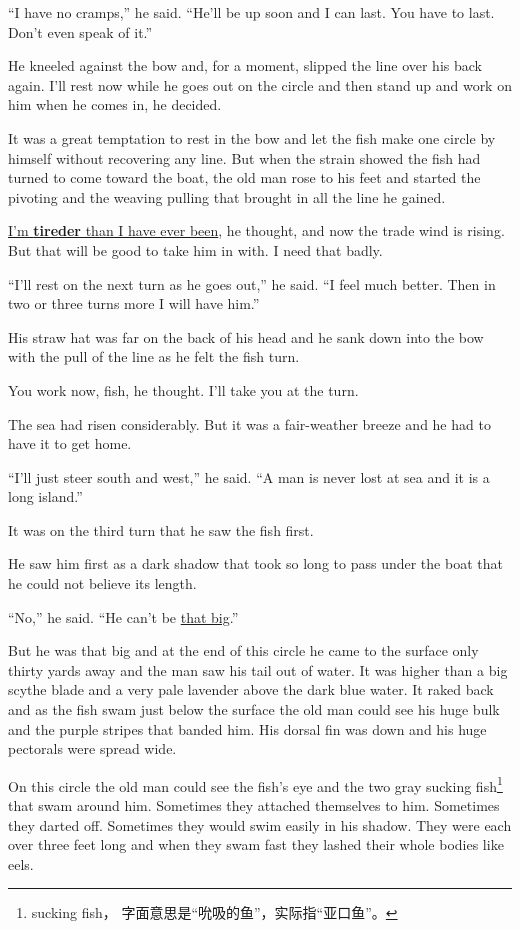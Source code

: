 ``I have no cramps,'' he said. ``He'll be up soon and I can last. You have
to last. Don't even speak of it.''

He kneeled against the bow and, for a moment, slipped the line over his back
again. I'll rest now while he goes out on the circle and then stand up and
work on him when he comes in, he decided.

It was a great temptation to rest in the bow and let the fish make one
circle by himself without recovering any line. But when the strain showed
the fish had turned to come toward the boat, the old man rose to his feet
and started the pivoting and the \gls{weaving} pulling that brought in all the
line he gained.

\uline{I'm \textbf{tireder} than I have ever been}, he thought, and now the trade wind is
rising. But that will be good to take him in with. I need that badly.

``I'll rest on the next turn as he goes out,'' he said. ``I feel much
better. Then in two or three turns more I will have him.''

His straw hat was far on the back of his head and he sank down into the bow
with the pull of the line as he felt the fish turn.

You work now, fish, he thought. I'll take you at the turn.

The sea had risen \gls{considerably}. But it was a \gls{fair-weather} breeze and
he had to have it to get home.

``I'll just \gls{steer} south and west,'' he said. ``A man is never lost at sea
and it is a long island.''

It was on the third turn that he saw the fish first.

He saw him first as a dark shadow that took so long to pass under the boat
that he could not believe its length.

``No,'' he said. ``He can't be \uline{that big}.''

But he was that big and at the end of this circle he came to the surface
only thirty yards away and the man saw his tail out of water. It was higher
than a big scythe blade and a very \gls{pale} lavender above the dark blue
water. It \gls{raked} back and as the fish swam just below the surface the
old man could see his huge \gls{bulk} and the purple stripes that
\gls{banded} him. His \gls{dorsal} fin was down and his huge pectorals
were spread wide.

On this circle the old man could see the fish's eye and the two gray sucking
fish\footnote{sucking fish， 字面意思是“吮吸的鱼”，实际指“亚口鱼”。}
that swam around him. Sometimes they \gls{attached} themselves to him.
Sometimes they \gls{darted} off. Sometimes they would swim easily in his
shadow. They were each over three feet long and when they swam fast they
\gls{lashed} their whole bodies like \glspl{eel}.

